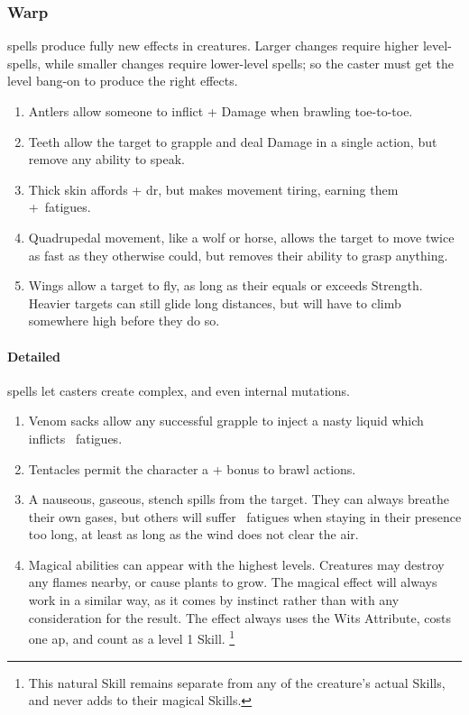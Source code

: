 \begin{multicols}{2}
\subsubsection{Warp}
spells produce fully new effects in creatures.
Larger changes require higher level-spells, while smaller changes require lower-level spells; so the caster must get the level bang-on to produce the right effects.
  \begin{enumerate}
    \item
      Antlers allow someone to inflict + Damage when brawling toe-to-toe.
    \item
      Teeth allow the target to grapple and deal Damage in a single action, but remove any ability to speak.
    \item
      Thick skin affords + \gls{dr}, but makes movement tiring, earning them +~\glspl{fatigue}.
    \item
      Quadrupedal movement, like a wolf or horse, allows the target to move twice as fast as they otherwise could, but removes their ability to grasp anything.
    \item
      Wings allow a target to fly, as long as their  equals or exceeds Strength.
      Heavier targets can still glide long distances, but will have to climb somewhere high before they do so.
  \end{enumerate}

\paragraph{Detailed}
spells let casters create complex, and even internal mutations.

\begin{enumerate}
  \item
    \setcounter{track}{\value{enumi}}%
    \addtocounter{track}{\value{track}}%
    Venom sacks allow any successful grapple to inject a nasty liquid which inflicts ~\glspl{fatigue}.
  \item
    Tentacles permit the character a + bonus to brawl actions.
  \item
    A nauseous, gaseous, stench spills from the target.
    They can always breathe their own gases, but others will suffer ~\glspl{fatigue} when staying in their presence too long, at least as long as the wind does not clear the air.
  \item
    Magical abilities can appear with the highest levels.
    Creatures may destroy any flames nearby, or cause plants to grow.
    The magical effect will always work in a similar way, as it comes by instinct rather than with any consideration for the result.
    The effect always uses the Wits Attribute, costs one \gls{ap}, and count as a level 1 Skill.%
    \footnote{This natural Skill remains separate from any of the creature's actual Skills, and never adds to their magical Skills.}
\end{enumerate}


\end{multicols}

